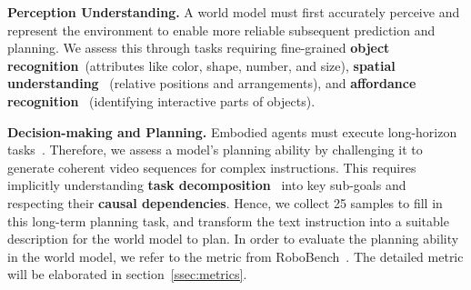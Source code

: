 \textbf{Perception Understanding.}
A world model must first accurately perceive and represent the environment to enable more reliable subsequent prediction and planning. We assess this through tasks requiring fine-grained \textbf{object recognition}~\cite{cheng2024egothinkevaluatingfirstpersonperspective, cheng2024videgothinkassessingegocentricvideo, 10654928, chow2025physbench}(attributes like color, shape, number, and size), \textbf{spatial understanding}~\cite{yang2025thinkingspacemultimodallarge, cheng2025embodiedevalevaluatemultimodalllms, song2025robospatialteachingspatialunderstanding, du2024embspatialbenchbenchmarkingspatialunderstanding} (relative positions and arrangements), and \textbf{affordance recognition}~\cite{gibson2014theory, nasiriany2025rt, cheng2025embodiedevalevaluatemultimodalllms} (identifying interactive parts of objects). 


\textbf{Decision-making and Planning.}
Embodied agents must execute long-horizon tasks~\cite{chen2024egoplanbenchbenchmarkingmultimodallarge, sermanet2023robovqamultimodallonghorizonreasoning, li2024mmromultimodalllmseligible, cheng2024videgothinkassessingegocentricvideo, yang2025embodiedbenchcomprehensivebenchmarkingmultimodal}. Therefore, we assess a model's planning ability by challenging it to generate coherent video sequences for complex instructions. This requires implicitly understanding \textbf{task decomposition}~\cite{chi2024eva, tian2025seea} into key sub-goals and respecting their \textbf{causal dependencies}. Hence, we collect 25 samples to fill in this long-term planning task, and transform the text instruction into a suitable description for the world model to plan. In order to evaluate the planning ability in the world model, we refer to the metric from RoboBench~\cite{luo2025robobench}. The detailed metric will be elaborated in section~\ref{ssec:metrics}. 


